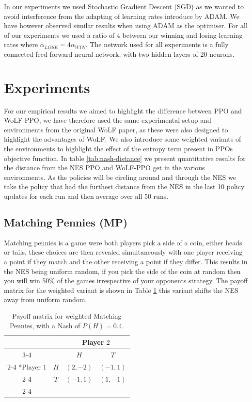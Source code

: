 \documentclass[conference]{IEEEtran}
\begin{document}
In our experiments we used Stochastic Gradient Descent (SGD) as we wanted to avoid interference from the adapting of learning rates introduce by ADAM. We have however observed similar results when using ADAM as the optimiser. For all of our experiments we used a ratio of $4$ between our winning and losing learning rates where $\alpha_{LOSE} = 4\alpha_{WIN}$. The network used for all experiments is a fully connected feed forward neural network, with two hidden layers of $20$ neurons.

\section{Experiments}


For our empirical results we aimed to highlight the difference between PPO and WoLF-PPO, we have therefore used the same experimental setup and environments from the original WoLF paper, as these were also designed to highlight the advantages of WoLF\cite{bowling2002multiagent}. We also introduce some weighted variants of the environments to highlight the effect of the entropy term present in PPOs objective function. In table \ref{tab:nash-distance} we present quantitative results for the distance from the NES PPO and WoLF-PPO get in the various environments. As the policies will be circling around and through the NES we take the policy that had the furthest distance from the NES in the last 10 policy updates for each run and then average over all 50 runs.

\subsection{Matching Pennies (MP)}

Matching pennies is a game were both players pick a side of a coin, either heads or tails, these choices are then revealed simultaneously with one player receiving a point if they match and the other receiving a point if they differ. This results in the NES being uniform random, if you pick the side of the coin at random then you will win 50\% of the games irrespective of your opponents strategy. The payoff matrix for the weighted variant is shown in Table \ref{tab:weighted-mp} this variant shifts the NES away from uniform random.

\begin{table}[!ht]
    \centering
    \setlength{\extrarowheight}{2pt}
    \begin{tabular}{*{4}{c|}}
      \multicolumn{2}{c}{} & \multicolumn{2}{c}{Player $2$}\\\cline{3-4}
      \multicolumn{1}{c}{} &  & $H$  & $T$ \\\cline{2-4}
      \multirow{2}*{Player $1$}  & $H$ & $(2,-2)$ & $(-1,1)$ \\\cline{2-4}
      & $T$ & $(-1,1)$ & $(1,-1)$ \\\cline{2-4}
    \end{tabular}
    \caption{Payoff matrix for weighted Matching Pennies, with a Nash of $P(H)=0.4$.}
    \label{tab:weighted-mp}
\end{table}
\end{document}
